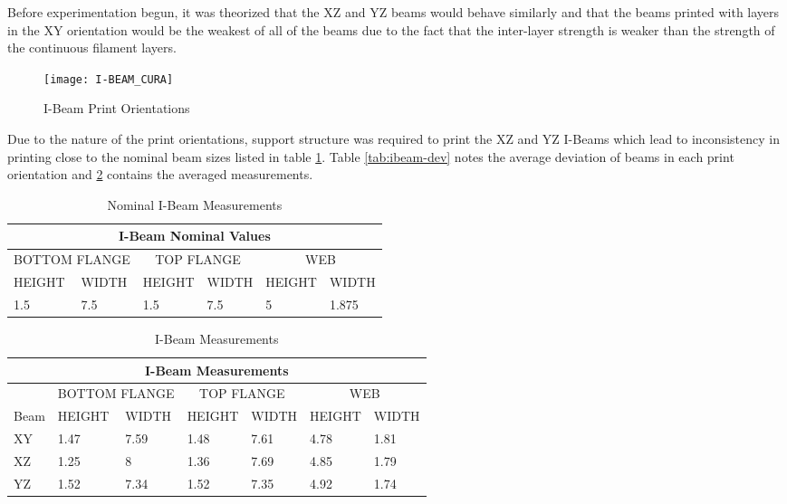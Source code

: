 	Before experimentation begun, it was theorized that the XZ and YZ beams would behave similarly and that the beams printed with layers in the XY orientation would be the weakest of all of the beams due to the fact that the inter-layer strength is weaker than the strength of the continuous filament layers.
	
	\begin{figure} [H]
		\centering
		\caption{I-Beam Print Orientations}
		\texttt{[image: I-BEAM\_CURA]}
		\label{fig:I-Beam_Orientations}
	\end{figure}

	Due to the nature of the print orientations, support structure was required to print the XZ and YZ I-Beams which lead to inconsistency in printing close to the nominal beam sizes listed in table \ref{tab:ibeam-nom}. Table \ref{tab:ibeam-dev} notes the average deviation of beams in each print orientation and \ref{tab:ibeam-meas} contains the averaged measurements.
	
	\begin{table} [h]
	\centering
		\begin{tabularx}{\textwidth}{| X | X | X | X | X | X |}
		\hline
			\multicolumn{6}{|c|}{I-Beam Nominal Values} \\ \hline
			\multicolumn{2}{|c|}{BOTTOM FLANGE} & \multicolumn{2}{c|}{TOP FLANGE} & \multicolumn{2}{c|}{WEB}\\ \hline
			 HEIGHT & WIDTH & HEIGHT & WIDTH & HEIGHT & WIDTH \\
			 1.5 & 7.5 & 1.5 & 7.5 & 5 & 1.875 \\ \hline
		\end{tabularx}
		\caption{Nominal I-Beam Measurements}
		\label{tab:ibeam-nom}
	\end{table}
	
	\begin{table} [h]
	\centering
		\begin{tabularx}{\textwidth}{| X | X | X | X | X | X | X |}
		\hline
			\multicolumn{7}{|c|}{I-Beam Measurements} \\ \hline
			& \multicolumn{2}{c|}{BOTTOM FLANGE} & \multicolumn{2}{c|}{TOP FLANGE} & \multicolumn{2}{c|}{WEB}\\ \hline
			Beam & HEIGHT & WIDTH & HEIGHT & WIDTH & HEIGHT & WIDTH \\ \hline
			XY & 1.47 & 7.59 & 1.48 & 7.61 & 4.78 & 1.81 \\ \hline
			XZ & 1.25 & 8 & 1.36 & 7.69 & 4.85 & 1.79 \\ \hline
			YZ & 1.52 & 7.34 & 1.52 & 7.35 & 4.92 & 1.74 \\ \hline
		\end{tabularx}
		\caption{I-Beam Measurements}
		\label{tab:ibeam-meas}
	\end{table}
	

